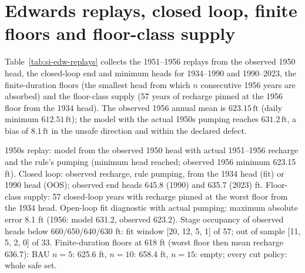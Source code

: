\documentclass[11pt,a4paper]{article}
\newcommand{\ft}{\,\mathrm{ft}}
\begin{document}
\section{Edwards replays, closed loop, finite floors and floor-class supply}\label{si:edw-replays}
Table~\ref{tab:si-edw-replays} collects the 1951--1956 replays from the observed 1950 head, the closed-loop end and minimum heads for 1934--1990 and 1990--2023, the finite-duration floors (the smallest head from which $n$ consecutive 1956 years are absorbed) and the floor-class supply (57 years of recharge pinned at the 1956 floor from the 1934 head). The observed 1956 annual mean is $623.15\ft$ (daily minimum $612.51\ft$); the model with the actual 1950s pumping reaches $631.2\ft$, a bias of $8.1\ft$ in the unsafe direction and within the declared defect.
\begin{table}[H]
\centering
\caption{Edwards: replays, closed-loop end heads and floor-class supply.}
\label{tab:si-edw-replays}
\small
{}
\par\smallskip\begin{minipage}{0.97\linewidth}\footnotesize 1950s replay: model from the observed 1950 head with actual 1951--1956 recharge and the rule's pumping (minimum head reached; observed 1956 minimum 623.15 ft). Closed loop: observed recharge, rule pumping, from the 1934 head (fit) or 1990 head (OOS); observed end heads 645.8 (1990) and 635.7 (2023) ft. Floor-class supply: 57 closed-loop years with recharge pinned at the worst floor from the 1934 head. Open-loop fit diagnostic with actual pumping: maximum absolute error 8.1 ft (1956: model 631.2, observed 623.2). Stage occupancy of observed heads below 660/650/640/630 ft: fit window [20, 12, 5, 1] of 57; out of sample [11, 5, 2, 0] of 33. Finite-duration floors at 618 ft (worst floor then mean recharge 636.7): BAU $n=5$: 625.6 ft, $n=10$: 658.4 ft, $n=15$: empty; every cut policy: whole safe set.\end{minipage}
\end{table}
\end{document}
